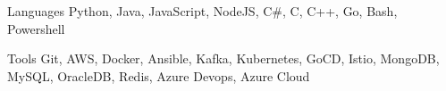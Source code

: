 
\begin{cvskills}
  \cvskill
    {Languages} %
    {Python, Java, JavaScript, NodeJS, C\#, C, C++, Go, Bash, Powershell} %
    
  \cvskill
    {Tools} %
    {Git, AWS, Docker, Ansible, Kafka, Kubernetes, GoCD, Istio, MongoDB, MySQL, OracleDB, Redis, Azure Devops, Azure Cloud} %
\end{cvskills}
